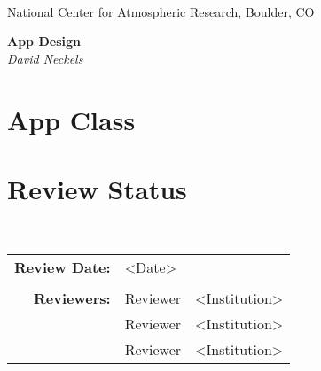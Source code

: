 \documentclass[]{article}
\begin{document}

\begin{titlepage}

\begin{latexonly}
 \\
\noindent National Center for Atmospheric Research, Boulder, CO \\
\vspace{2in}
\end{latexonly}

\begin{center}
{\Large\bf App Design} \\
\medskip
{\it David Neckels}
\end{center}

\end{titlepage}

\tableofcontents

\newpage


\section{App Class}

%







\section{Review Status}

 \\

\begin{tabular}{r p{1.3in} p{2in}}
{\bf Review Date:} & <Date> \\ \\
{\bf Reviewers:}   & Reviewer           & <Institution> \\
                   & Reviewer           & <Institution> \\
                   & Reviewer           & <Institution>
\end{tabular}

%

 

\end{document}
